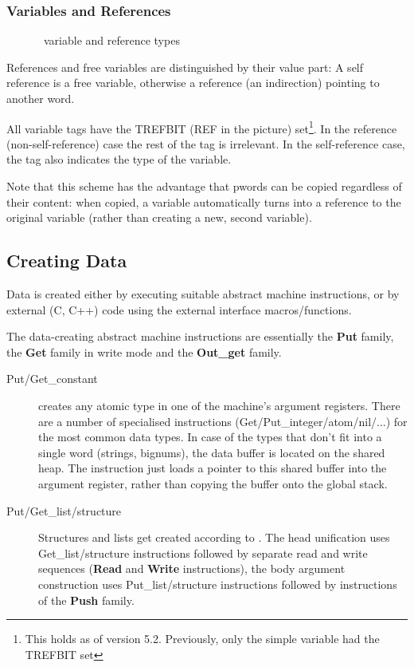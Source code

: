 \subsubsection{Variables and References}
\begin{figure}
\caption{\eclipse\ variable and reference types}
\end{figure}
References and free variables are distinguished by their value part:
A self reference is a free variable, otherwise a reference (an indirection)
pointing to another word.

All variable tags have the TREFBIT (REF in the picture) set\footnote{
This holds as of version 5.2. Previously, only the simple variable had
the TREFBIT set}.
In the reference (non-self-reference) case the rest of the tag is
irrelevant.  In the self-reference case, the tag also indicates the
type of the variable.

Note that this scheme has the advantage that pwords can be copied
regardless of their content: when copied, a variable automatically
turns into a reference to the original variable (rather than creating
a new, second variable).


\subsection{Creating Data}

Data is created either by executing suitable abstract machine
instructions, or by external (C, C++) code using the external
interface macros/functions.

The data-creating abstract machine instructions are essentially the
{\bf Put} family, the {\bf Get} family in write mode and the
{\bf Out_get} family.
\begin{description}
\item[Put/Get_constant] creates any atomic type in one of the
        machine's argument registers.
        There are a number of specialised instructions
        (Get/Put_integer/atom/nil/...) for the most common data types.
        In case of the types that don't
        fit into a single word (strings, bignums), the data buffer is
        located on the shared heap. The instruction just loads a pointer
        to this shared buffer into the argument register, rather than
        copying the buffer onto the global stack.
\item[Put/Get_list/structure]
        Structures and lists get created according to
        \cite{compnd}. The head unification uses Get_list/structure
        instructions followed by separate read and write sequences
        ({\bf Read} and {\bf Write} instructions), the body
        argument construction uses Put_list/structure instructions
        followed by instructions of the {\bf Push} family.
\end{description}


